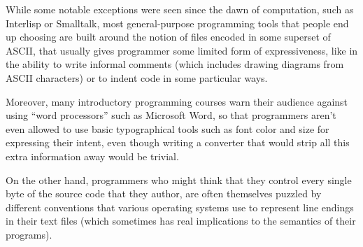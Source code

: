 \documentclass[acmsmall,nonacm]{acmart}
\begin{document}
While some notable exceptions were seen since the dawn
of computation, such as Interlisp or Smalltalk, most
general-purpose programming tools that people end up
choosing are built around the notion of files encoded
in some superset of ASCII, that usually gives programmer
some limited form of expressiveness, like in the ability
to write informal comments (which includes drawing diagrams
from ASCII characters) or to indent code in some particular
ways.

Moreover, many introductory programming courses warn
their audience against using ``word processors'' such
as Microsoft Word, so that programmers aren't even allowed
to use basic typographical tools such as font color and
size for expressing their intent, even though writing
a converter that would strip all this extra information away
would be trivial.

On the other hand, programmers who might think that
they control every single byte of the source code that
they author, are often themselves puzzled by different
conventions that various operating systems use to represent
line endings in their text files (which sometimes has
real implications to the semantics of their programs).




% 
\end{document}
